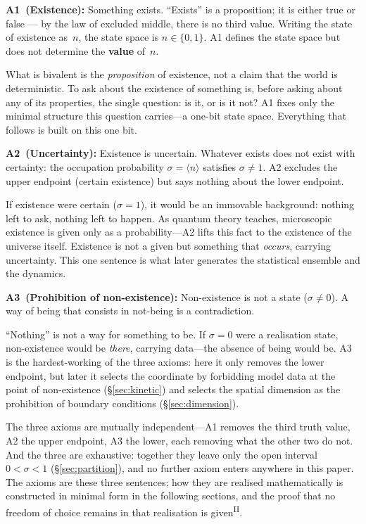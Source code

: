 \documentclass[12pt,a4paper]{article}
\newcommand{\PII}{\textsuperscript{\textup{II}}}
\begin{document}
\noindent\textbf{A1~(Existence):}\;
Something exists. ``Exists'' is a proposition; it is either true
or false --- by the law of excluded middle, there is no third value.
Writing the state of existence as~$n$, the state space is
$n \in \{0,1\}$. A1 defines the state space but does not
determine the \textbf{value} of~$n$.

What is bivalent is the \emph{proposition} of existence, not a claim that the world is deterministic. To ask about the existence of something is, before asking about any of its properties, the single question: is it, or is it not? A1 fixes only the minimal structure this question carries---a one-bit state space. Everything that follows is built on this one bit.

\medskip
\noindent\textbf{A2~(Uncertainty):}\;
Existence is uncertain. Whatever exists does not exist with
certainty: the occupation probability
$\sigma = \langle n \rangle$ satisfies $\sigma \neq 1$.
A2 excludes the upper endpoint (certain existence) but says nothing
about the lower endpoint.

If existence were certain ($\sigma = 1$), it would be an immovable background: nothing left to ask, nothing left to happen. As quantum theory teaches, microscopic existence is given only as a probability---A2 lifts this fact to the existence of the universe itself. Existence is not a given but something that \emph{occurs}, carrying uncertainty. This one sentence is what later generates the statistical ensemble and the dynamics.

\medskip
\noindent\textbf{A3~(Prohibition of non-existence):}\;
Non-existence is not a state ($\sigma \neq 0$). A way of being
that consists in not-being is a contradiction.

``Nothing'' is not a way for something to be. If $\sigma = 0$ were a realisation state, non-existence would be \emph{there}, carrying data---the absence of being would be. A3 is the hardest-working of the three axioms: here it only removes the lower endpoint, but later it selects the coordinate by forbidding model data at the point of non-existence (\S\ref{sec:kinetic}) and selects the spatial dimension as the prohibition of boundary conditions (\S\ref{sec:dimension}).

The three axioms are mutually independent---A1 removes the third truth value, A2 the upper endpoint, A3 the lower, each removing what the other two do not. And the three are exhaustive: together they leave only the open interval $0 < \sigma < 1$ (\S\ref{sec:partition}), and no further axiom enters anywhere in this paper. The axioms are these three sentences; how they are realised mathematically is constructed in minimal form in the following sections, and the proof that no freedom of choice remains in that realisation is given\PII{}.
\end{document}
